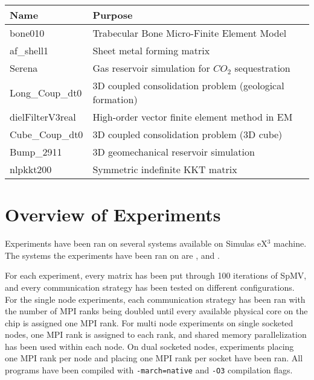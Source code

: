 \begin{table}[H]
\begin{center}
\begin{tabular}[c]{|l|l|}
\hline
\textbf{Name}&\textbf{Purpose}  \\
\hline
bone010&Trabecular Bone Micro-Finite Element Model\\
\hline
af\_shell1&Sheet metal forming matrix\\
\hline
Serena&Gas reservoir simulation for \(CO_{2}\) sequestration\\
\hline
Long\_Coup\_dt0&3D coupled consolidation problem (geological formation)\\
\hline
dielFilterV3real&High-order vector finite element method in EM\\
\hline
Cube\_Coup\_dt0&3D coupled consolidation problem (3D cube)\\
\hline
Bump\_2911&3D geomechanical reservoir simulation\\
\hline
nlpkkt200&Symmetric indefinite KKT matrix\\
\hline
\end{tabular}
\end{center}
\end{table}


\section{Overview of Experiments}
Experiments have been ran on several systems available on Simulas eX\(^{3}\) machine. The systems the experiments have been ran on are , \romeq\phantom{a}and \fpgaq.
\medskip

For each experiment, every matrix has been put through 100 iterations of SpMV, and every communication strategy has been tested on different configurations. For the single node experiments, each communication strategy has been ran with the number of MPI ranks being doubled until every available physical core on the chip is assigned one MPI rank. For multi node experiments on single socketed nodes, one MPI rank is assigned to each rank, and shared memory parallelization has been used within each node. On dual socketed nodes, experiments placing one MPI rank per node and placing one MPI rank per socket have been ran. All programs have been compiled with \texttt{-march=native} and \texttt{-O3} compilation flags.

